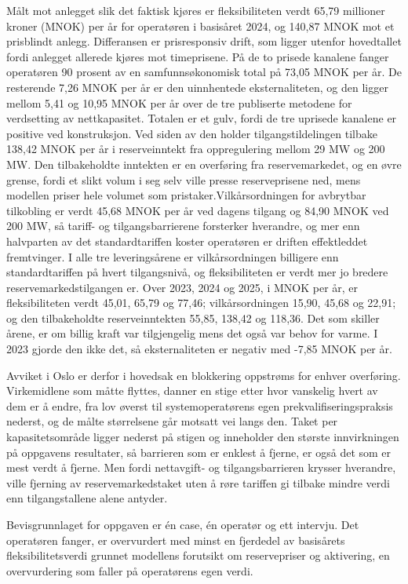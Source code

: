 Målt mot anlegget slik det faktisk kjøres er fleksibiliteten verdt 65,79 millioner kroner (MNOK) per år for operatøren i basisåret 2024, og 140,87 MNOK mot et prisblindt anlegg. Differansen er prisresponsiv drift, som ligger utenfor hovedtallet fordi anlegget allerede kjøres mot timeprisene. På de to prisede kanalene fanger operatøren 90 prosent av en samfunnsøkonomisk total på 73,05 MNOK per år. De resterende 7,26 MNOK per år er den uinnhentede eksternaliteten, og den ligger mellom 5,41 og 10,95 MNOK per år over de tre publiserte metodene for verdsetting av nettkapasitet. Totalen er et gulv, fordi de tre uprisede kanalene er positive ved konstruksjon. Ved siden av den holder tilgangstildelingen tilbake 138,42 MNOK per år i reserveinntekt fra oppregulering mellom 29 MW og 200 MW. Den tilbakeholdte inntekten er en overføring fra reservemarkedet, og en øvre grense, fordi et slikt volum i seg selv ville presse reserveprisene ned, mens modellen priser hele volumet som pristaker.Vilkårsordningen for avbrytbar tilkobling er verdt 45,68 MNOK per år ved dagens tilgang og 84,90 MNOK ved 200 MW, så tariff- og tilgangsbarrierene forsterker hverandre, og mer enn halvparten av det standardtariffen koster operatøren er driften effektleddet fremtvinger. I alle tre leveringsårene er vilkårsordningen billigere enn standardtariffen på hvert tilgangsnivå, og fleksibiliteten er verdt mer jo bredere reservemarkedstilgangen er. Over 2023, 2024 og 2025, i MNOK per år, er fleksibiliteten verdt 45,01, 65,79 og 77,46; vilkårsordningen 15,90, 45,68 og 22,91; og den tilbakeholdte reserveinntekten 55,85, 138,42 og 118,36. Det som skiller årene, er om billig kraft var tilgjengelig mens det også var behov for varme. I 2023 gjorde den ikke det, så eksternaliteten er negativ med -7,85 MNOK per år.

Avviket i Oslo er derfor i hovedsak en blokkering oppstrøms for enhver overføring. Virkemidlene som måtte flyttes, danner en stige etter hvor vanskelig hvert av dem er å endre, fra lov øverst til systemoperatørens egen prekvalifiseringspraksis nederst, og de målte størrelsene går motsatt vei langs den. Taket per kapasitetsområde ligger nederst på stigen og inneholder den største innvirkningen på oppgavens resultater, så barrieren som er enklest å fjerne, er også det som er mest verdt å fjerne. Men fordi nettavgift- og tilgangsbarrieren krysser hverandre, ville fjerning av reservemarkedstaket uten å røre tariffen gi tilbake mindre verdi enn tilgangstallene alene antyder. 

Bevisgrunnlaget for oppgaven er én case, én operatør og ett intervju. Det operatøren fanger, er overvurdert med minst en fjerdedel av basisårets fleksibilitetsverdi grunnet modellens forutsikt om reservepriser og aktivering, en overvurdering som faller på operatørens egen verdi. 